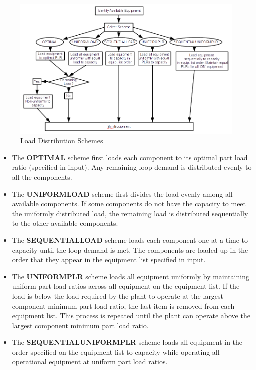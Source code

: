 \begin{figure}[hbtp] %
\centering
\includegraphics{media/image1974.png}\caption{Load Distribution Schemes \protect \label{load-distribution-schemes}}
\end{figure}

\begin{itemize}
\item
    The \textbf{OPTIMAL} scheme first loads each component to its optimal part load ratio (specified in input). Any remaining loop demand is distributed evenly to all the components.
\item
    The \textbf{UNIFORMLOAD} scheme first divides the load evenly among all available components.
    If some components do not have the capacity to meet the uniformly distributed load, the remaining load is distributed sequentially to the other available components.
\item
    The \textbf{SEQUENTIALLOAD} scheme loads each component one at a time to capacity until the loop demand is met.
    The components are loaded up in the order that they appear in the equipment list specified in input.
\item
    The \textbf{UNIFORMPLR} scheme loads all equipment uniformly by maintaining uniform part load ratios across all equipment on the equipment list.
    If the load is below the load required by the plant to operate at the largest component minimum part load ratio, the last item is removed from each equipment list.
    This process is repeated until the plant can operate above the largest component minimum part load ratio.
\item
    The \textbf{SEQUENTIALUNIFORMPLR} scheme loads all equipment in the order specified on the equipment list to capacity while operating all operational equipment at uniform part load ratios.
\end{itemize}

